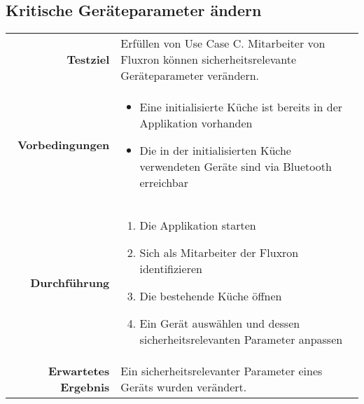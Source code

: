 \subsection{Kritische Geräteparameter ändern}
\begin{table}[H]
\begin{tabularx}{\textwidth}{r X }
\textbf{Testziel} & Erfüllen von Use Case C. Mitarbeiter von Fluxron können sicherheitsrelevante Geräteparameter verändern. \\
\textbf{Vorbedingungen} & \begin{itemize}
\item Eine initialisierte Küche ist bereits in der Applikation vorhanden
\item Die in der initialisierten Küche verwendeten Geräte sind via Bluetooth erreichbar
\end{itemize} \\
\textbf{Durchführung} & \begin{enumerate}
\item Die Applikation starten
\item Sich als Mitarbeiter der Fluxron identifizieren
\item Die bestehende Küche öffnen
\item Ein Gerät auswählen und dessen sicherheitsrelevanten Parameter anpassen
\end{enumerate} \\
\textbf{Erwartetes Ergebnis} & Ein sicherheitsrelevanter Parameter eines Geräts wurden verändert.\\
\end{tabularx}
\end{table}